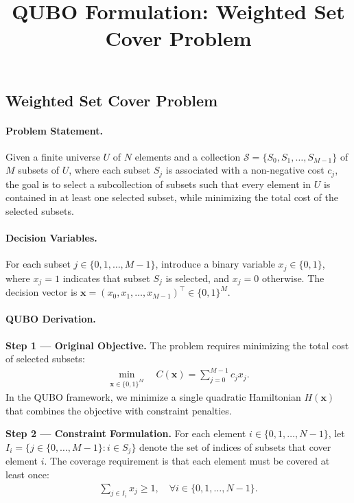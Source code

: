 \documentclass[12pt]{article}
\title{QUBO Formulation: Weighted Set Cover Problem}
\date{}
\begin{document}
\maketitle

\subsection*{Weighted Set Cover Problem}

\paragraph{Problem Statement.}
Given a finite universe $U$ of $N$ elements and a collection $\mathcal{S} = \{S_0, S_1, \dots, S_{M-1}\}$ of $M$ subsets of $U$, where each subset $S_j$ is associated with a non-negative cost $c_j$, the goal is to select a subcollection of subsets such that every element in $U$ is contained in at least one selected subset, while minimizing the total cost of the selected subsets.

\paragraph{Decision Variables.}
For each subset $j \in \{0, 1, \dots, M-1\}$, introduce a binary variable $x_j \in \{0, 1\}$, where $x_j = 1$ indicates that subset $S_j$ is selected, and $x_j = 0$ otherwise. The decision vector is $\mathbf{x} = (x_0, x_1, \dots, x_{M-1})^\top \in \{0, 1\}^M$.

\paragraph{QUBO Derivation.}
\textbf{Step 1 --- Original Objective.} The problem requires minimizing the total cost of selected subsets:
\begin{align}
\min_{\mathbf{x} \in \{0,1\}^M} \quad C(\mathbf{x}) = \sum_{j=0}^{M-1} c_j x_j.
\end{align}
In the QUBO framework, we minimize a single quadratic Hamiltonian $H(\mathbf{x})$ that combines the objective with constraint penalties.

\textbf{Step 2 --- Constraint Formulation.} For each element $i \in \{0, 1, \dots, N-1\}$, let $I_i = \{j \in \{0, \dots, M-1\} : i \in S_j\}$ denote the set of indices of subsets that cover element $i$. The coverage requirement is that each element must be covered at least once:
\begin{align}
\sum_{j \in I_i} x_j \ge 1, \quad \forall i \in \{0, 1, \dots, N-1\}.
\end{align}
\end{document}
